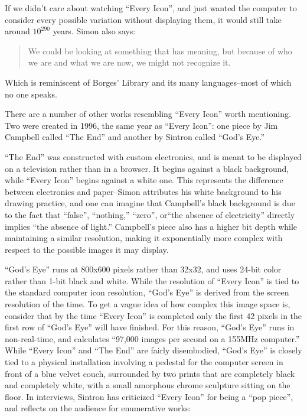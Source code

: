\documentclass{thesis}
\begin{document}
	If we didn't care about watching ``Every Icon'', and just wanted the computer to consider every possible variation without displaying them, it would still take around $10^{290}$ years. Simon also says:
	
	\begin{quote}
	We could be looking at something that has meaning, but because of who we are and what we are now, we might not recognize it.
	\end{quote}
	
	Which is reminiscent of Borges' Library and its many languages--most of which no one speaks.
	
	There are a number of other works resembling ``Every Icon'' worth mentioning. Two were created in 1996, the same year as ``Every Icon'': one piece by Jim Campbell called ``The End''\cite{jim_campbell_end_1996} and another by Sintron called ``God's Eye.''\cite{sintron_gods_2003}
	
	``The End'' was constructed with custom electronics, and is meant to be displayed on a television rather than in a browser. It begins against a black background, while ``Every Icon'' begins against a white one. This represents the difference between electronics and paper--Simon attributes his white background to his drawing practice, and one can imagine that Campbell's black background is due to the fact that ``false'', ``nothing,'' ``zero'',  or``the absence of electricity'' directly implies ``the absence of light.'' Campbell's piece also has a higher bit depth while maintaining a similar resolution, making it exponentially more complex with respect to the possible images it may display.
	
	``God's Eye'' runs at 800x600 pixels rather than 32x32, and uses 24-bit color rather than 1-bit black and white. While the resolution of ``Every Icon'' is tied to the standard computer icon resolution, ``God's Eye'' is derived from the screen resolution of the time. To get a vague idea of how complex this image space is, consider that by the time ``Every Icon'' is completed only the first 42 pixels in the first row of ``God's Eye'' will have finished. For this reason, ``God's Eye'' runs in non-real-time, and calculates ``97,000 images per second on a 155MHz computer.'' While ``Every Icon'' and ``The End'' are fairly disembodied, ``God's Eye'' is closely tied to a physical installation involving a pedestal for the computer screen in front of a blue velvet couch, surrounded by two prints that are completely black and completely white, with a small amorphous chrome sculpture sitting on the floor. In interviews, Sintron has criticized ``Every Icon'' for being a ``pop piece''\cite{olga_goriunova_and_alexei_shulgin_touching_2003}, and reflects on the audience for enumerative works:
	
\end{document}
